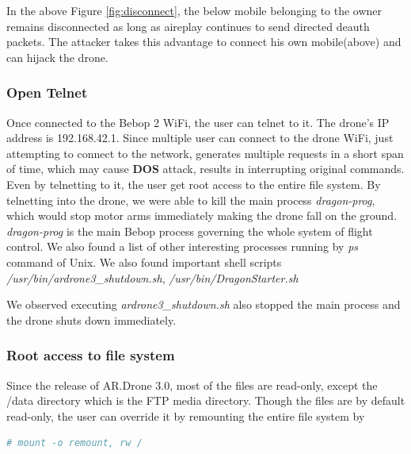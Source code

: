 \documentclass[conference]{IEEEtran}
\begin{document}
In the above Figure \ref{fig:disconnect}, the below mobile belonging to the owner remains disconnected as long as aireplay continues to send directed deauth packets. The attacker takes this advantage to connect his own mobile(above) and can hijack the drone.  

\subsubsection{Open Telnet}
Once connected to the Bebop 2 WiFi, the user can telnet to it. The drone's IP address is 192.168.42.1. Since multiple user can connect to the drone WiFi, just attempting to connect to the network, generates multiple requests in a short span of time, which may cause \textbf{DOS} attack, results in interrupting original commands. Even by telnetting to it, the user get root access to the entire file system. 
By telnetting into the drone, we were able to kill the main process \textit{dragon-prog},  which would stop motor arms immediately making the drone fall on the ground. \textit{dragon-­prog} is the main Bebop process governing the whole system of flight control.
We also found a list of other interesting processes running by \emph{ps} command of Unix. We also found important shell scripts
\emph{/usr/bin/ardrone3\_shutdown.sh}, \emph{/usr/bin/DragonStarter.sh}

We observed executing \emph{ardrone3\_shutdown.sh} also stopped the main process and the drone shuts down immediately. 

\subsubsection{Root access to file system}
Since the release of AR.Drone 3.0, most of the files are read-only, except the /data directory which is the FTP media directory. Though the files are by default read-only, the user can override it by remounting the entire file system by
\begin{lstlisting}[language =  bash]
# mount -o remount, rw /
\end{lstlisting}

\end{document}

